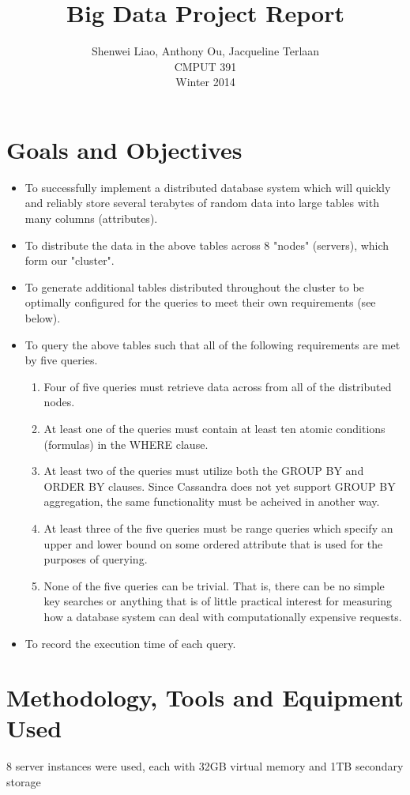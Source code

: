 \documentclass[letterpaper]{article}
\title{Big Data Project Report}
\author{Shenwei Liao, Anthony Ou, Jacqueline Terlaan\\
	CMPUT 391\\
Winter 2014}
\begin{document}
\maketitle
\section{Goals and Objectives}
\begin{itemize}
	\item To successfully implement a distributed database system which
		will quickly and reliably store several terabytes of random
		data into large tables with many columns (attributes).
	\item To distribute the data in the above tables across 8 "nodes"
		(servers), which form our "cluster".
	\item To generate additional tables distributed throughout the cluster
		to be optimally configured for the queries to meet their own
		requirements (see below).

	\item To query the above tables such that all of the following requirements
		are met by five queries.
		\begin{enumerate}
			\item Four of five queries must retrieve data across from all of the distributed nodes.
			\item At least one of the queries must contain at least ten atomic
				conditions (formulas) in the WHERE clause.
			\item At least two of the queries must utilize both the GROUP BY and
				ORDER BY clauses. Since Cassandra does not yet support GROUP BY
				aggregation, the same functionality must be acheived in another
				way.
			\item At least three of the five queries must be range queries which
				specify an upper and lower bound on some ordered attribute that
				is used for the purposes of querying.
			\item None of the five queries can be trivial. That is, there can be
				no simple key searches or anything that is of little practical
				interest for measuring how a database system can deal with
				computationally expensive requests.
		\end{enumerate}

	\item To record the execution time of each query.
\end{itemize}

\section{Methodology, Tools and Equipment Used}
8 server instances were used, each with 32GB virtual memory and 1TB secondary storage 
\end{document}
